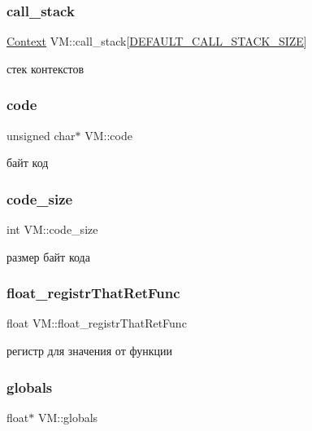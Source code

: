 \subsubsection{\texorpdfstring{call\+\_\+stack}{call\_stack}}
{\footnotesize\ttfamily \hyperlink{struct_context}{Context} V\+M\+::call\+\_\+stack\mbox{[}\hyperlink{vm_8h_a8b344ec0cbf964588d894f826d85fc28}{D\+E\+F\+A\+U\+L\+T\+\_\+\+C\+A\+L\+L\+\_\+\+S\+T\+A\+C\+K\+\_\+\+S\+I\+ZE}\mbox{]}}

стек контекстов \mbox{\label{struct_v_m_a760a936633eb5c7b8de120b5d78f9ba6}} 
\subsubsection{\texorpdfstring{code}{code}}
{\footnotesize\ttfamily unsigned char$\ast$ V\+M\+::code}

байт код \mbox{\label{struct_v_m_aa5f1f79d48c3a3512a232000f3eb4c26}} 
\subsubsection{\texorpdfstring{code\+\_\+size}{code\_size}}
{\footnotesize\ttfamily int V\+M\+::code\+\_\+size}

размер байт кода \mbox{\label{struct_v_m_af2f5a8140e32988b2e1c20cc4f913b2e}} 
\subsubsection{\texorpdfstring{float\+\_\+registr\+That\+Ret\+Func}{float\_registrThatRetFunc}}
{\footnotesize\ttfamily float V\+M\+::float\+\_\+registr\+That\+Ret\+Func}

регистр для значения от функции \mbox{\label{struct_v_m_ab913bee0d5cd7b6b11a1ae4db7f5b576}} 
\subsubsection{\texorpdfstring{globals}{globals}}
{\footnotesize\ttfamily float$\ast$ V\+M\+::globals}

